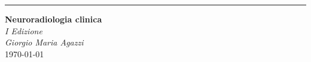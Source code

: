\begin{titlepage}
    \raggedleft	
    \rule{1pt}{.125\textheight}
	\hspace{0.025\textwidth}
	\parbox[b]{.85\textwidth}{
		{\HUGE\bfseries Neuroradiologia clinica
        }\\[2\baselineskip]
		{\Large\textit{I Edizione}}\\[45.5\baselineskip]
        {\Large\textit{Giorgio Maria Agazzi}}\\
        {\Large\today}

 }
\end{titlepage}